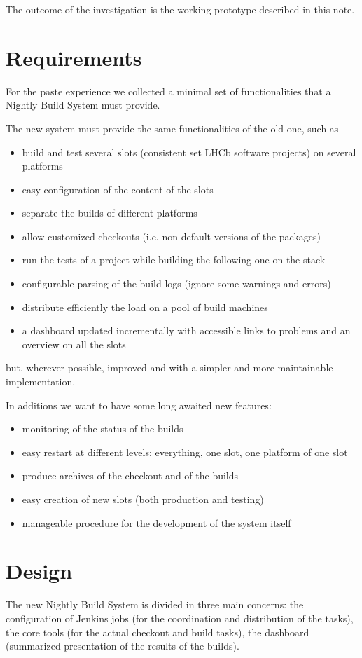 \documentclass{lhcbnote}
\begin{document}
The outcome of the investigation is the working prototype described in this
note.

\section{Requirements}
For the paste experience we collected a minimal set of functionalities that a
Nightly Build System must provide.

The new system must provide the same functionalities of the old one, such as
\begin{itemize}
  \item build and test several slots (consistent set LHCb software projects) on
several platforms
  \item easy configuration of the content of the slots
  \item separate the builds of different platforms
  \item allow customized checkouts (i.e. non default versions of the packages)
  \item run the tests of a project while building the following one on the stack
  \item configurable parsing of the build logs (ignore some warnings and errors)
  \item distribute efficiently the load on a pool of build machines
  \item a dashboard updated incrementally with accessible links to problems and
an overview on all the slots
\end{itemize}
but, wherever possible, improved and with a simpler and more maintainable
implementation.

In additions we want to have some long awaited new features:
\begin{itemize}
  \item monitoring of the status of the builds
  \item easy restart at different levels: everything, one slot, one platform of
one slot
  \item produce archives of the checkout and of the builds
  \item easy creation of new slots (both production and testing)
  \item manageable procedure for the development of the system itself
\end{itemize}

\section{Design}
The new Nightly Build System is divided in three main concerns: the
configuration of Jenkins jobs (for the coordination and distribution of the
tasks), the core tools (for the actual checkout and build tasks), the dashboard
(summarized presentation of the results of the builds).
\end{document}
